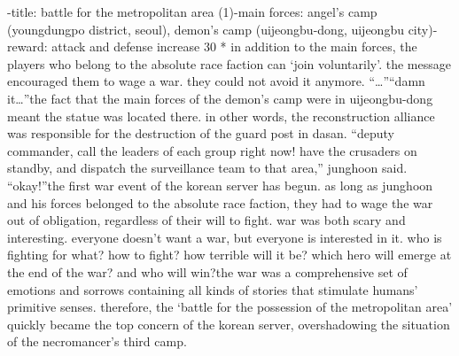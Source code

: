 -title: battle for the metropolitan area (1)-main forces: angel’s camp (youngdungpo district, seoul), demon’s camp (uijeongbu-dong, uijeongbu city)-reward: attack and defense increase 30%
* in addition to the main forces, the players who belong to the absolute race faction can ‘join voluntarily’.
the message encouraged them to wage a war.
 they could not avoid it anymore.
“…”“damn it…”the fact that the main forces of the demon’s camp were in uijeongbu-dong meant the statue was located there.
 in other words, the reconstruction alliance was responsible for the destruction of the guard post in dasan.
“deputy commander, call the leaders of each group right now! have the crusaders on standby, and dispatch the surveillance team to that area,” junghoon said.
“okay!”the first war event of the korean server has begun.
as long as junghoon and his forces belonged to the absolute race faction, they had to wage the war out of obligation, regardless of their will to fight.
war was both scary and interesting.
 everyone doesn’t want a war, but everyone is interested in it.
 who is fighting for what? how to fight? how terrible will it be? which hero will emerge at the end of the war? and who will win?the war was a comprehensive set of emotions and sorrows containing all kinds of stories that stimulate humans’ primitive senses.
therefore, the ‘battle for the possession of the metropolitan area’ quickly became the top concern of the korean server, overshadowing the situation of the necromancer’s third camp.


 